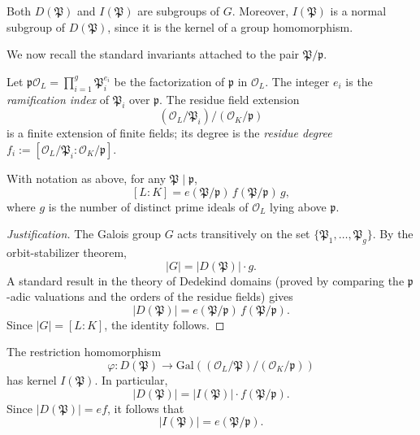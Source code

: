 \begin{remark}
Both \(D(\mathfrak{P})\) and \(I(\mathfrak{P})\) are subgroups of \(G\). Moreover, \(I(\mathfrak{P})\) is a normal subgroup of \(D(\mathfrak{P})\), since it is the kernel of a group homomorphism.
\end{remark}

We now recall the standard invariants attached to the pair \(\mathfrak{P}/\mathfrak{p}\).

\begin{defn}
Let \(\mathfrak{p}\mathcal{O}_L = \prod_{i=1}^{g} \mathfrak{P}_i^{e_i}\) be the factorization of \(\mathfrak{p}\) in \(\mathcal{O}_L\). The integer \(e_i\) is the \emph{ramification index} of \(\mathfrak{P}_i\) over \(\mathfrak{p}\). The residue field extension
\[
(\mathcal{O}_L/\mathfrak{P}_i) / (\mathcal{O}_K/\mathfrak{p})
\]
is a finite extension of finite fields; its degree is the \emph{residue degree} \(f_i := [\mathcal{O}_L/\mathfrak{P}_i : \mathcal{O}_K/\mathfrak{p}]\).
\end{defn}

\begin{thm}
With notation as above, for any \(\mathfrak{P} \mid \mathfrak{p}\),
\[
[L:K] = e(\mathfrak{P}/\mathfrak{p}) \, f(\mathfrak{P}/\mathfrak{p}) \, g,
\]
where \(g\) is the number of distinct prime ideals of \(\mathcal{O}_L\) lying above \(\mathfrak{p}\).
\end{thm}

\begin{proof}[Justification]
The Galois group \(G\) acts transitively on the set \(\{\mathfrak{P}_1, \dots, \mathfrak{P}_g\}\). By the orbit-stabilizer theorem,
\[
|G| = |D(\mathfrak{P})| \cdot g.
\]
A standard result in the theory of Dedekind domains (proved by comparing the \(\mathfrak{p}\)-adic valuations and the orders of the residue fields) gives
\[
|D(\mathfrak{P})| = e(\mathfrak{P}/\mathfrak{p}) \, f(\mathfrak{P}/\mathfrak{p}).
\]
Since \(|G| = [L:K]\), the identity follows.
\end{proof}

\begin{cor}
The restriction homomorphism
\[
\varphi: D(\mathfrak{P}) \longrightarrow \mathrm{Gal}((\mathcal{O}_L/\mathfrak{P}) / (\mathcal{O}_K/\mathfrak{p}))
\]
has kernel \(I(\mathfrak{P})\). In particular,
\[
|D(\mathfrak{P})| = |I(\mathfrak{P})| \cdot f(\mathfrak{P}/\mathfrak{p}).
\]
Since \(|D(\mathfrak{P})| = e f\), it follows that
\[
|I(\mathfrak{P})| = e(\mathfrak{P}/\mathfrak{p}).
\]
\end{cor}

